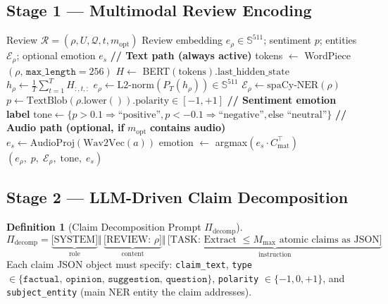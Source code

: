 \documentclass[12pt,a4paper]{article}
\theoremstyle{definition}
\newtheorem{definition}{Definition}[section]
\theoremstyle{plain}
\theoremstyle{remark}
\newcommand{\Sph}{\mathbb{S}}
\begin{document}
\subsection{Stage 1 — Multimodal Review Encoding}
\label{sec:arrs_stage1}

\begin{algorithm}[H]
\caption{ARRS Stage 1 --- Multimodal Review Encoding}
\label{alg:arrs_encode}
\begin{algorithmic}[1]
\Require Review $\mathcal{R} = (\rho, U, \mathcal{Q}, t, m_{\text{opt}})$
\Ensure Review embedding $e_\rho \in \Sph^{511}$; sentiment $p$; entities $\mathcal{E}_\rho$;
        optional emotion $e_s$
\State \textbf{// Text path (always active)}
\State tokens $\gets$ WordPiece$(\rho,\, \texttt{max\_length}=256)$
\State $H \gets$ BERT$(\text{tokens}).\text{last\_hidden\_state}$ 
\State $h_\rho \gets \frac{1}{T}\sum_{t=1}^{T} H_{:,t,:}$ 
\State $e_\rho \gets \text{L2-norm}(P_T(h_\rho)) \in \Sph^{511}$
\State $\mathcal{E}_\rho \gets \text{spaCy-NER}(\rho)$ 
\State $p \gets \text{TextBlob}(\rho.\text{lower}()).\text{polarity} \in [-1,+1]$
\State \textbf{// Sentiment emotion label}
\State $\text{tone} \gets \{p > 0.1 \Rightarrow \text{``positive''}, p < -0.1 \Rightarrow \text{``negative''}, \text{else ``neutral''}\}$
\State \textbf{// Audio path (optional, if }$m_{\text{opt}}$\textbf{ contains audio)}
  \State $e_s \gets \text{AudioProj}(\text{Wav2Vec}(a))$ 
  \State emotion $\gets$ argmax$(e_s \cdot C_{\text{mat}}^\top)$ 
\EndIf
\State \Return $(e_\rho,\; p,\; \mathcal{E}_\rho,\; \text{tone},\; e_s)$
\end{algorithmic}
\end{algorithm}

\subsection{Stage 2 — LLM-Driven Claim Decomposition}
\label{sec:arrs_stage2}

\begin{definition}[Claim Decomposition Prompt $\Pi_{\text{decomp}}$]
\[
  \Pi_{\text{decomp}} = 
  \underbrace{\text{[SYSTEM]}}_{\text{role}} 
  \Vert\, \underbrace{\text{[REVIEW: }\rho\text{]}}_{\text{content}} 
  \Vert\, \underbrace{\text{[TASK: Extract }\le M_{\max}\text{ atomic claims as JSON]}}_{\text{instruction}}
\]
Each claim JSON object must specify: \texttt{claim\_text}, \texttt{type} 
$\in \{\mathtt{factual},\, \mathtt{opinion},\, \mathtt{suggestion},\, \mathtt{question}\}$, 
\texttt{polarity} $\in \{-1, 0, +1\}$, and \texttt{subject\_entity} (main NER 
entity the claim addresses).
\end{definition}
\end{document}
